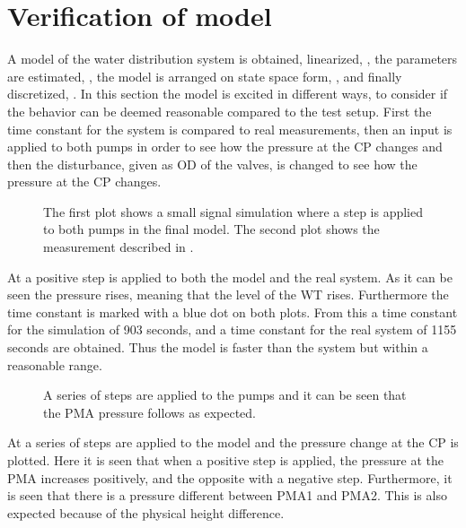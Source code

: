 \section{Verification of model}
\label{verification_of_model}

A model of the water distribution system is obtained, linearized, , the parameters are estimated, , the model is arranged on state space form, , and finally discretized, . In this section the model is excited in different ways, to consider if the behavior can be deemed reasonable compared to the test setup. First the time constant for the system is compared to real measurements, then an input is applied to both pumps in order to see how the pressure at the CP changes and then the disturbance, given as OD of the valves, is changed to see how the pressure at the CP changes. 

\begin{figure}[H]
   \centering
    
    \caption{The first plot shows a small signal simulation where a step is applied to both pumps in the final model. The second plot shows the measurement described in .}
    \label{simulation_time_constant}
\end{figure}

At  a positive step is applied to both the model and the real system. As it can be seen the pressure rises, meaning that the level of the WT rises. Furthermore the time constant is marked with a blue dot on both plots. From this a time constant for the simulation of 903 seconds, and a time constant for the real system of 1155 seconds are obtained. Thus the model is faster than the system but within a reasonable range.

\begin{figure}[H]
   \centering
    
    \caption{A series of steps are applied to the pumps and it can be seen that the PMA pressure follows as expected.}
    \label{input_simulation}
\end{figure}

At  a series of steps are applied to the model and the pressure change at the CP is plotted. Here it is seen that when a positive step is applied, the pressure at the PMA increases positively, and the opposite with a negative step. Furthermore, it is seen that there is a pressure different between PMA1 and PMA2. This is also expected because of the physical height difference.  

